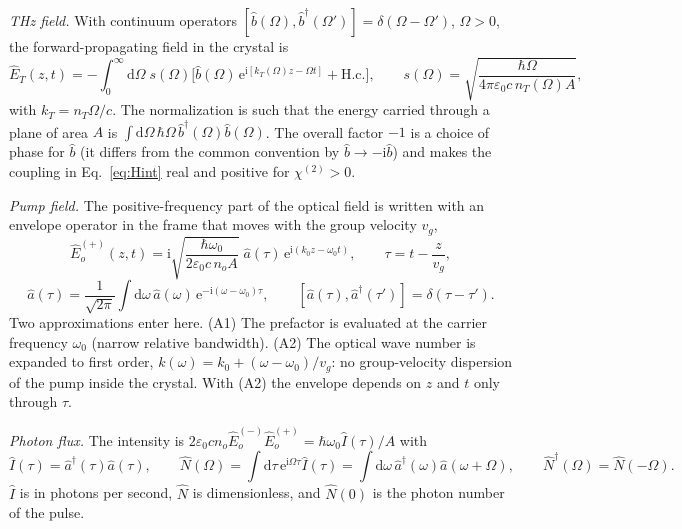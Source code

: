 \documentclass[aps,pra,onecolumn,notitlepage,11pt,amsmath,amssymb,nofootinbib]{revtex4-2}
\newcommand{\Nop}{\hat N}
\newcommand{\Iop}{\hat I}
\newcommand{\dd}{\mathrm{d}}
\newcommand{\ee}{\mathrm{e}}
\newcommand{\ii}{\mathrm{i}}
\begin{document}
\emph{THz field.} With continuum operators
$[\hat b(\Omega),\hat b^\dagger(\Omega')]=\delta(\Omega-\Omega')$, $\Omega>0$,
the forward-propagating field in the crystal is \cite{blow1990}
\begin{equation}
\hat E_T(z,t)=-\int_0^\infty\!\!\dd\Omega\;s(\Omega)
\Big[\hat b(\Omega)\,\ee^{\ii[k_T(\Omega)z-\Omega t]}+\mathrm{H.c.}\Big],
\qquad
s(\Omega)=\sqrt{\frac{\hbar\Omega}{4\pi\varepsilon_0c\,n_T(\Omega)A}} ,
\label{eq:ET}
\end{equation}
with $k_T=n_T\Omega/c$. The normalization is such that the energy carried
through a plane of area $A$ is
$\int\dd\Omega\,\hbar\Omega\,\hat b^\dagger(\Omega)\hat b(\Omega)$. The overall
factor $-1$ is a choice of phase for $\hat b$ (it
differs from the common convention by $\hat b\to-\ii\hat b$) and makes the
coupling in Eq.~\eqref{eq:Hint} real and positive for $\chi^{(2)}>0$.

\emph{Pump field.} The positive-frequency part of the optical field is
written with an envelope operator in the frame that moves with the group
velocity $v_g$,
\begin{equation}
\hat E_o^{(+)}(z,t)=\ii\sqrt{\frac{\hbar\omega_0}{2\varepsilon_0c\,n_oA}}\;
\hat a(\tau)\,\ee^{\ii(k_0z-\omega_0t)},\qquad \tau=t-\frac{z}{v_g},
\label{eq:Eo}
\end{equation}
\begin{equation}
\hat a(\tau)=\frac{1}{\sqrt{2\pi}}\int\!\dd\omega\,\hat a(\omega)\,
\ee^{-\ii(\omega-\omega_0)\tau},\qquad
[\hat a(\tau),\hat a^\dagger(\tau')]=\delta(\tau-\tau').
\end{equation}
Two approximations enter here. (A1) The prefactor is evaluated at the carrier
frequency $\omega_0$ (narrow relative bandwidth). (A2) The optical wave number
is expanded to first order, $k(\omega)=k_0+(\omega-\omega_0)/v_g$: no
group-velocity dispersion of the pump inside the crystal. With (A2) the
envelope depends on $z$ and $t$ only through $\tau$.

\emph{Photon flux.} The intensity is
$2\varepsilon_0cn_o\hat E_o^{(-)}\hat E_o^{(+)}=\hbar\omega_0\Iop(\tau)/A$ with
\begin{equation}
\Iop(\tau)=\hat a^\dagger(\tau)\hat a(\tau),\qquad
\Nop(\Omega)=\int\!\dd\tau\,\ee^{\ii\Omega\tau}\Iop(\tau)
=\int\!\dd\omega\,\hat a^\dagger(\omega)\hat a(\omega+\Omega),\qquad
\Nop^\dagger(\Omega)=\Nop(-\Omega).
\label{eq:N}
\end{equation}
$\Iop$ is in photons per second, $\Nop$ is dimensionless, and $\Nop(0)$ is the
photon number of the pulse.
\end{document}
